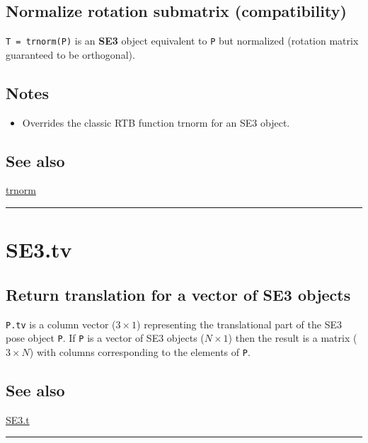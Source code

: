 \subsection*{Normalize rotation submatrix (compatibility)}


\texttt{T = trnorm(P)} is an \textbf{\color{red} SE3} object equivalent to \texttt{P} but
normalized (rotation matrix guaranteed to be orthogonal).


\subsection*{Notes}
\begin{itemize}
  \item Overrides the classic RTB function trnorm for an SE3 object.
\end{itemize}

\subsection*{See also}


\hyperlink{trnorm}{\color{blue} trnorm}

\vspace{1.5ex}\hrule

\hypertarget{SE3.tv}{\section*{SE3.tv}}
\subsection*{Return translation for a vector of SE3 objects}


\texttt{P.tv} is a column vector ($3 \times 1$) representing the translational part of the
SE3 pose object \texttt{P}.  If \texttt{P} is a vector of SE3 objects ($N \times 1$) then the result
is a matrix ($3 \times N$) with columns corresponding to the elements of \texttt{P}.


\subsection*{See also}


\hyperlink{SE3.t}{\color{blue} SE3.t}

\vspace{1.5ex}\hrule

